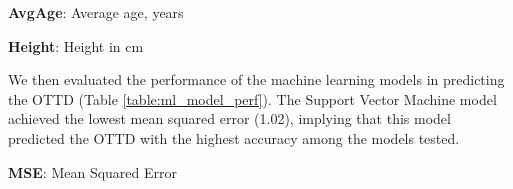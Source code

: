 \documentclass[11pt]{article}
\begin{document}
\begin{table}[h]
\caption{Descriptive statistics of age and height stratified by sex}
\label{table:desc_stats_age_height}
\begin{threeparttable}
\renewcommand{\TPTminimum}{\linewidth}
\begin{tablenotes}
\footnotesize
\item \textbf{AvgAge}: Average age, years
\item \textbf{Height}: Height in cm
\end{tablenotes}
\end{threeparttable}
\end{table}


We then evaluated the performance of the machine learning models in predicting the OTTD (Table {}\ref{table:ml_model_perf}). The Support Vector Machine model achieved the lowest mean squared error (1.02), implying that this model predicted the OTTD with the highest accuracy among the models tested.

\begin{table}[h]
\caption{Overall Performance of Machine Learning Models}
\label{table:ml_model_perf}
\begin{threeparttable}
\renewcommand{\TPTminimum}{\linewidth}
\begin{tablenotes}
\footnotesize
\item \textbf{MSE}: Mean Squared Error
\end{tablenotes}
\end{threeparttable}
\end{table}
\end{document}
